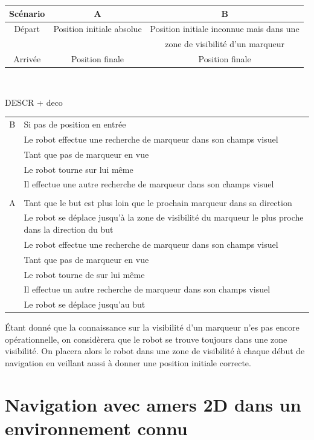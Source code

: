 \documentclass[10pt,a4paper]{article}
\begin{document}
\begin{center}
\begin{tabular}{c|c|c}
Scénario & A & B \\ \hline
Départ & Position initiale absolue & Position initiale inconnue mais dans une \\ 
  &  & zone de visibilité d'un marqueur \\  \hline
Arrivée & Position finale & Position finale 
\end{tabular}\\
\end{center}

DESCR + deco\\
\begin{tabular}{cl}
B & Si pas de position en entrée  \\
  & Le robot effectue une recherche de marqueur dans son champs visuel \\
  & Tant que pas de marqueur en vue \\
  & Le robot tourne sur lui même \\
  & Il effectue une autre recherche de marqueur dans son champs visuel \\
& \\
A & Tant que le but est plus loin que le prochain marqueur dans sa direction \\
  & Le robot se déplace jusqu'à la zone de visibilité du marqueur le plus proche dans la direction du but  \\
  & Le robot effectue une recherche de marqueur dans son champs visuel \\
  & Tant que pas de marqueur en vue  \\
  & Le robot tourne de sur lui même  \\
  & Il effectue un autre recherche de marqueur dans son champs visuel \\
  & Le robot se déplace jusqu'au but  \\
\end{tabular}

Étant donné que la connaissance sur la visibilité d'un marqueur n'es pas encore opérationnelle, on considèrera que le robot se trouve toujours dans une zone visibilité. On placera alors le robot dans une zone de visibilité à chaque début de navigation en veillant aussi à donner une position initiale correcte.

\section{Navigation avec amers 2D dans un environnement connu}
\label{sec:navigation_avec_amers_2D_dans_un_environnement_connu}
\end{document}
